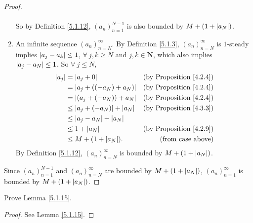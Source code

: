 \begin{proof}
\begin{enumerate}
\begin{align*}
              \end{align*}
              So by Definition \ref{5.1.12}, \((a_n)_{n = 1}^{N - 1}\) is also bounded by \(M + (1 + \abs*{a_N})\).
        \item An infinite sequence \((a_n)_{n = N}^{\infty}\).
              By Definition \ref{5.1.3}, \((a_n)_{n = N}^{\infty}\) is \(1\)-steady implies \(\abs*{a_j - a_k} \leq 1\), \(\forall\ j, k \geq N\) and  \(j, k \in \mathbf{N}\), which also implies \(\abs*{a_j - a_N} \leq 1\).
              So \(\forall\ j \leq N\),
              \begin{align*}
                  \abs*{a_j} & = \abs*{a_j + 0}                      & \text{(by Proposition \ref{4.2.4})} \\
                             & = \abs*{a_j + ((-a_N) + a_N)}         & \text{(by Proposition \ref{4.2.4})} \\
                             & = \abs*{(a_j + (-a_N)) + a_N}         & \text{(by Proposition \ref{4.2.4})} \\
                             & \leq \abs*{a_j + (-a_N)} + \abs*{a_N} & \text{(by Proposition \ref{4.3.3})} \\
                             & \leq \abs*{a_j - a_N} + \abs*{a_N}                                          \\
                             & \leq 1 + \abs*{a_N}                   & \text{(by Proposition \ref{4.2.9})} \\
                             & \leq M + (1 + \abs*{a_N}).            & \text{(from case above)}
              \end{align*}
              By Definition \ref{5.1.12}, \((a_n)_{n = N}^{\infty}\) is bounded by \(M + (1 + \abs*{a_N})\).
    \end{enumerate}
    Since \((a_n)_{n = 1}^{N - 1}\) and \((a_n)_{n = N}^{\infty}\) are bounded by \(M + (1 + \abs*{a_N})\), \((a_n)_{n = 1}^{\infty}\) is bounded by \(M + (1 + \abs*{a_N})\).
\end{proof}

\exercisesection

\begin{exercise}\label{ex 5.1.1}
    Prove Lemma \ref{5.1.15}.
\end{exercise}

\begin{proof}
    See Lemma \ref{5.1.15}.
\end{proof}